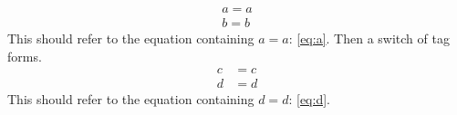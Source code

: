 \documentclass{article}
\begin{document}
\begin{align}
a=a \label{eq:a} \\
b=b \label{eq:b} %
\end{align}
This should refer to the equation containing $a=a$: \eqref{eq:a}.
Then a switch of tag forms.
\begin{align}
c&=c \label{eq:c} \\
d&=d \label{eq:d}
\end{align}
This should refer to the equation containing $d=d$: \eqref{eq:d}.
\end{document}
